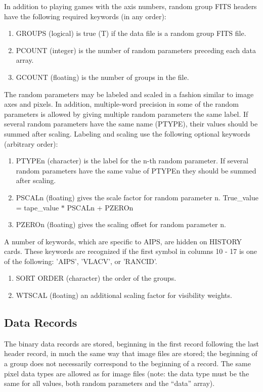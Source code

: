 In addition to playing games with the axis numbers, random group FITS
headers have the following required keywords (in any order):
\begin{enumerate} %
\item GROUPS (logical) is true (T) if the data file is a random group FITS
file.
\item PCOUNT (integer) is the number of random parameters preceding each
data array.
\item GCOUNT (floating) is the number of groups in the file.

\end{enumerate} %
The random parameters may be labeled and scaled in a fashion similar
to image axes and pixels.  In addition, multiple-word precision in
some of the random parameters is allowed by giving multiple random
parameters the same label.  If several random parameters have the same
name (PTYPE), their values should be summed after scaling. Labeling
and scaling use the following optional keywords (arbitrary order):
\begin{enumerate} %
\item PTYPEn (character) is the label for the n-th random parameter.  If
several random parameters have the same value of PTYPEn they should be
summed after scaling.
\item PSCALn (floating) gives the scale factor for random parameter n.
True\_value = tape\_value $\ast$ PSCALn + PZEROn
\item PZEROn (floating) gives the scaling offset for random parameter n.

\end{enumerate} %
A number of keywords, which are specific to AIPS, are hidden on
HISTORY cards.  These keywords are recognized if the first symbol in
columns 10 - 17 is one of the following: 'AIPS', 'VLACV', or 'RANCID'.
\begin{enumerate} %
\item SORT ORDER (character) the order of the groups.
\item WTSCAL (floating) an additional scaling factor for visibility weights.

\end{enumerate} %

\subsection{Data Records }
The binary data records are stored, beginning in the first record
following the last header record, in much the same way that image
files are stored; the beginning of a group does not necessarily
correspond to the beginning of a record.  The same pixel data types
are allowed as for image files (note: the data type must be the same
for all values, both random parameters and the ``data'' array).

